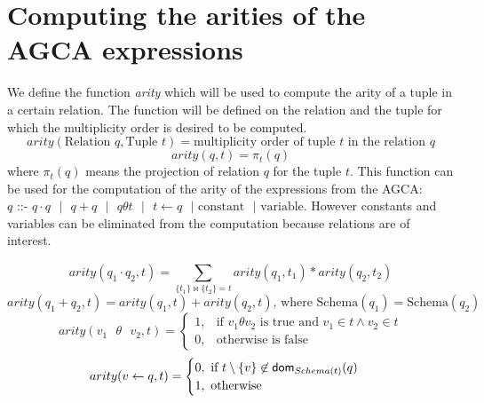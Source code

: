 \documentclass[12pt]{article}
\begin{document}
\section{Computing the arities of the AGCA expressions}
We define the function \emph{arity} which will be used to compute the arity of a tuple in a certain relation. The function will be defined on the relation and the tuple for which the multiplicity order is desired to be computed. $$arity(\text{Relation } q,\text{Tuple } t)=\text{multiplicity order of tuple }t\text{ in the relation } q$$ $$arity(q,t)=\pi_{t}(q)$$ where $\pi_{t}(q)$ means the projection of relation $q$ for the tuple $t$. This function can be used for the computation of the arity of the expressions from the AGCA: $q\text{ ::- }q\cdot q\text{ }|\text{ }q+q\text{ }|\text{ }q \theta t\text{ }|\text{ }t\gets q\text{ }|\text{ constant}\text{ }|\text{ variable}$. However constants and variables can be eliminated from the computation because relations are of interest.

$$arity(q_{1}\cdot q_{2},t)=\sum\limits_{\{t_{1}\}\Join \{t_{2}\}={t}}^{}arity(q_{1},t_{1})*arity(q_{2},t_{2})$$
$$arity(q_{1} + q_{2},t)=arity(q_{1},t)+arity(q_{2},t)\text{, where Schema}(q_{1})=\text{Schema}(q_{2}) $$
$$arity(v_1\text{ } \theta \text{ } v_2,t)=\begin{cases}1,& \mbox{if } v_1\theta v_2 \mbox{ is true and }v_{1}\in t \land v_{2}\in t\\
0,& \text{otherwise} \mbox{ is false} 
\end{cases}$$
$$arity(v\gets q,t)=\begin{cases}0, \mbox{ if $t\setminus\{v\}\not\in \text{\textsf{dom}}_{Schema(t)}(q)$}\\ 1, \mbox{ otherwise} \end{cases}$$
\end{document}
